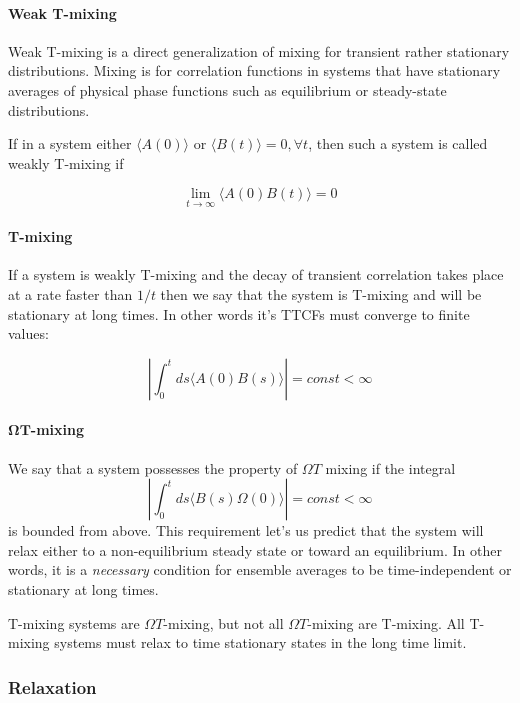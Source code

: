 \documentclass[a4paper,12pt]{article}
\begin{document}
\paragraph{Weak T-mixing}

Weak T-mixing is a direct generalization of mixing for transient rather stationary distributions. Mixing is for correlation functions in systems that have stationary averages of physical phase functions such as equilibrium or steady-state distributions.

If in a system either $\langle A(0) \rangle $ or $ \langle B(t) \rangle = 0, \forall t $, then such a system is called weakly T-mixing if

\begin{equation}
  \lim_{t \to \infty} \langle A(0) B(t) \rangle = 0
\end{equation}

\paragraph{T-mixing}
If a system is weakly T-mixing and the decay of transient correlation takes place at a rate faster than $1/t$ then we say that the system is T-mixing and will be stationary at long times. In other words it's TTCFs must converge to finite values:

\begin{equation}
  \left| \int_0^t ds \langle A(0) B(s) \rangle \right| = const < \infty 
\end{equation}


\paragraph{$\bm{\Omega T}$-mixing}
We say that a system possesses the property of $\Omega T$ mixing if the integral
\begin{equation}
    \left| \int_0^t ds \langle B(s) \Omega(0) \rangle \right| = const < \infty
\end{equation}
is bounded from above. This requirement let's us predict that the system will relax either to a non-equilibrium steady state or toward an equilibrium. In other words, it is a \textit{necessary} condition for ensemble averages to be time-independent or stationary at long times.

T-mixing systems are $\Omega T$-mixing, but not all $\Omega T$-mixing are T-mixing. All T-mixing systems must relax to time stationary states in the long time limit.


\subsubsection{Relaxation}
\end{document}
